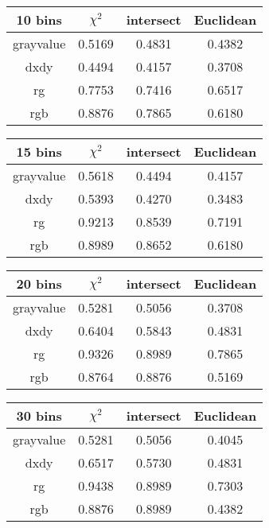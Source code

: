 \documentclass{article}
\begin{document}
\begin{table}[h!]
\centering
    \begin{tabular}{|c| c c c|}
\hline
\textbf{10 bins} & $\chi^2$ & intersect & Euclidean \\ [0.5ex] 
\hline\hline
grayvalue & 0.5169 & 0.4831 & 0.4382 \\
dxdy & 0.4494 & 0.4157 & 0.3708 \\
rg & 0.7753 & 0.7416 & 0.6517 \\
rgb & \cellcolor[HTML]{B0D0B0} 0.8876 & 0.7865 & 0.6180 \\
\hline
\end{tabular}

\vspace*{0.6 cm}

\begin{tabular}{|c| c c c|} 
\hline 
\textbf{15 bins} & $\chi^2$ & intersect & Euclidean \\ [0.5ex] 
\hline\hline
grayvalue & 0.5618 & 0.4494 & 0.4157 \\
dxdy & 0.5393 & 0.4270 & 0.3483 \\
rg & \cellcolor[HTML]{B0D0B0} 0.9213 & 0.8539 & 0.7191 \\
rgb & 0.8989 & 0.8652 & 0.6180 \\
\hline
\end{tabular}

\vspace*{0.6 cm}

\begin{tabular}{|c| c c c|} 
\hline 
\textbf{20 bins} & $\chi^2$ & intersect & Euclidean \\ [0.5ex] 
\hline\hline
grayvalue & 0.5281 & 0.5056 & 0.3708 \\
dxdy & 0.6404 & 0.5843 & 0.4831 \\
rg & \cellcolor[HTML]{B0D0B0} 0.9326 & 0.8989 & 0.7865 \\
rgb & 0.8764 & 0.8876 & 0.5169 \\
\hline
\end{tabular}

\vspace*{0.6 cm}

\begin{tabular}{|c| c c c|} 
\hline
\textbf{30 bins} & $\chi^2$ & intersect & Euclidean \\ [0.5ex] 
\hline\hline
grayvalue & 0.5281 & 0.5056 & 0.4045 \\
dxdy & 0.6517 & 0.5730 & 0.4831 \\
rg & \cellcolor[HTML]{90D090} 0.9438 & 0.8989 & 0.7303 \\
rgb & 0.8876 & 0.8989 & 0.4382 \\
\hline
\end{tabular}


\end{table}
\end{document}
